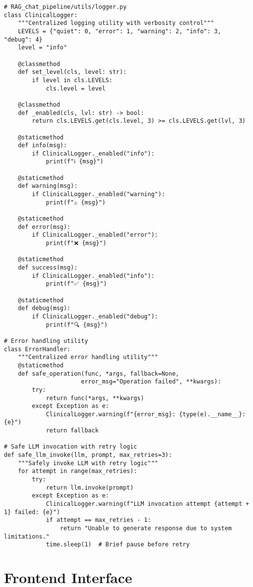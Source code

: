 \begin{verbatim}
# RAG_chat_pipeline/utils/logger.py
class ClinicalLogger:
    """Centralized logging utility with verbosity control"""
    LEVELS = {"quiet": 0, "error": 1, "warning": 2, "info": 3, "debug": 4}
    level = "info"

    @classmethod
    def set_level(cls, level: str):
        if level in cls.LEVELS:
            cls.level = level

    @classmethod
    def _enabled(cls, lvl: str) -> bool:
        return cls.LEVELS.get(cls.level, 3) >= cls.LEVELS.get(lvl, 3)

    @staticmethod
    def info(msg):
        if ClinicalLogger._enabled("info"):
            print(f"ℹ️ {msg}")

    @staticmethod
    def warning(msg):
        if ClinicalLogger._enabled("warning"):
            print(f"⚠️ {msg}")

    @staticmethod
    def error(msg):
        if ClinicalLogger._enabled("error"):
            print(f"❌ {msg}")

    @staticmethod
    def success(msg):
        if ClinicalLogger._enabled("info"):
            print(f"✅ {msg}")

    @staticmethod
    def debug(msg):
        if ClinicalLogger._enabled("debug"):
            print(f"🔍 {msg}")

# Error handling utility
class ErrorHandler:
    """Centralized error handling utility"""
    @staticmethod
    def safe_operation(func, *args, fallback=None, 
                      error_msg="Operation failed", **kwargs):
        try:
            return func(*args, **kwargs)
        except Exception as e:
            ClinicalLogger.warning(f"{error_msg}: {type(e).__name__}: {e}")
            return fallback

# Safe LLM invocation with retry logic
def safe_llm_invoke(llm, prompt, max_retries=3):
    """Safely invoke LLM with retry logic"""
    for attempt in range(max_retries):
        try:
            return llm.invoke(prompt)
        except Exception as e:
            ClinicalLogger.warning(f"LLM invocation attempt {attempt + 1} failed: {e}")
            if attempt == max_retries - 1:
                return "Unable to generate response due to system limitations."
            time.sleep(1)  # Brief pause before retry
\end{verbatim}

\section{Frontend Interface}

